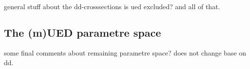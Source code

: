 \documentclass{article}
\begin{document}
\subsection{}
general stuff about the dd-crosssections is ued excluded? and all of that.




\subsection{The (m)UED parametre space}
some final comments about remaining parametre space? does not change base on dd.
\end{document}
